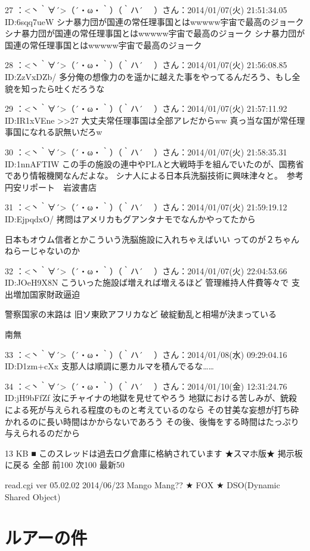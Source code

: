 27 ：<丶｀∀´>（´・ω・｀）（｀ハ´　 ）さん：2014/01/07(火) 21:51:34.05 ID:6sqq7ueW
    シナ暴力団が国連の常任理事国とはwwwww宇宙で最高のジョーク
    シナ暴力団が国連の常任理事国とはwwwww宇宙で最高のジョーク
    シナ暴力団が国連の常任理事国とはwwwww宇宙で最高のジョーク

28 ：<丶｀∀´>（´・ω・｀）（｀ハ´　 ）さん：2014/01/07(火) 21:56:08.85 ID:ZzVxDZb/
    多分俺の想像力のを遥かに越えた事をやってるんだろう、もし全貌を知ったら吐くだろうな

29 ：<丶｀∀´>（´・ω・｀）（｀ハ´　 ）さん：2014/01/07(火) 21:57:11.92 ID:IR1xVEne
    >>27
    大丈夫常任理事国は全部アレだからww
    真っ当な国が常任理事国になれる訳無いだろw

30 ：<丶｀∀´>（´・ω・｀）（｀ハ´　 ）さん：2014/01/07(火) 21:58:35.31 ID:1nnAFTIW
    この手の施設の連中やPLAと大戦時手を組んでいたのが、国務省であり情報機関なんだよな。
    シナ人による日本兵洗脳技術に興味津々と。　参考　円安リポート　岩波書店

31 ：<丶｀∀´>（´・ω・｀）（｀ハ´　 ）さん：2014/01/07(火) 21:59:19.12 ID:EjpqdxO/
    拷問はアメリカもグアンタナモでなんかやってたから

    日本もオウム信者とかこういう洗脳施設に入れちゃえばいい
    ってのが２ちゃんねらーじゃないのか

32 ：<丶｀∀´>（´・ω・｀）（｀ハ´　 ）さん：2014/01/07(火) 22:04:53.66 ID:JOeH9X8N
    こういった施設ば増えれば増えるほど
    管理維持人件費等々で
    支出増加国家財政逼迫

    警察国家の末路は
    旧ソ東欧アフリカなど
    破綻動乱と相場が決まっている

    南無

33 ：<丶｀∀´>（´・ω・｀）（｀ハ´　 ）さん：2014/01/08(水) 09:29:04.16 ID:D1zm+cXx
    支那人は順調に悪カルマを積んでるな……

34 ：<丶｀∀´>（´・ω・｀）（｀ハ´　 ）さん：2014/01/10(金) 12:31:24.76 ID:jH9bFfZf
    汝にチャイナの地獄を見せてやろう
    地獄における苦しみが、銃殺による死が与えられる程度のものと考えているのなら
    その甘美な妄想が打ち砕かれるのに長い時間はかからないであろう
    その後、後悔をする時間はたっぷり与えられるのだから

13 KB
■ このスレッドは過去ログ倉庫に格納されています
★スマホ版★ 掲示板に戻る 全部 前100 次100 最新50

read.cgi ver 05.02.02 2014/06/23 Mango Mang?? ★
FOX ★ DSO(Dynamic Shared Object)

\section{ルアーの件}


